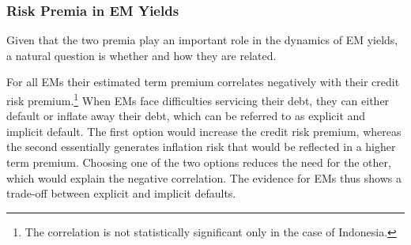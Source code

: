 {%


\subsubsection{Risk Premia in EM Yields}
\iftoggle{toclinks}{\gototoc}{} %

Given that the two premia play an important role in the dynamics of EM yields, a natural question is whether and how they are related.

For all EMs their estimated term premium correlates negatively with their credit risk premium.\footnote{ The correlation is not statistically significant only in the case of Indonesia.} 
When EMs face difficulties servicing their debt, they can either default or inflate away their debt, which can be referred to as explicit and implicit default. %
The first option would increase the credit risk premium, whereas the second essentially generates inflation risk that would be reflected in a higher term premium.
Choosing one of the two options reduces the need for the other, which would explain the negative correlation.
The evidence for EMs thus shows a trade-off between explicit and implicit defaults.

}
